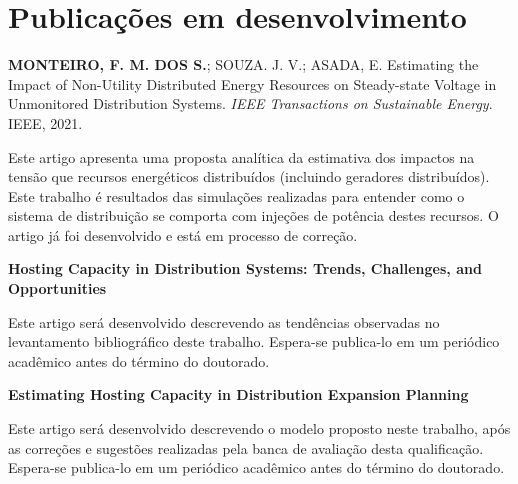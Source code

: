  \section{Publicações em desenvolvimento}
 
 \noindent \textbf{MONTEIRO, F. M. DOS S.}; SOUZA. J. V.; ASADA, E. Estimating the Impact of Non-Utility Distributed Energy Resources on Steady-state Voltage in Unmonitored Distribution Systems. \textit{IEEE Transactions on Sustainable Energy}. IEEE, 2021.

Este artigo apresenta uma proposta analítica da estimativa dos impactos na tensão que recursos energéticos distribuídos (incluindo geradores distribuídos). Este trabalho é resultados das simulações realizadas para entender como o sistema de distribuição se comporta com injeções de potência destes recursos. O artigo já foi desenvolvido e está em processo de correção.

\vspace{1cm}
\noindent \textbf{Hosting Capacity in Distribution Systems: Trends, Challenges, and Opportunities}
 
Este artigo será desenvolvido descrevendo as tendências observadas no levantamento bibliográfico deste trabalho. Espera-se publica-lo em um periódico acadêmico antes do término do doutorado.
 
\vspace{1cm}
\noindent \textbf{Estimating Hosting Capacity in Distribution Expansion Planning}

Este artigo será desenvolvido descrevendo o modelo proposto neste trabalho, após as correções e sugestões realizadas pela banca de avaliação desta qualificação. Espera-se publica-lo em um periódico acadêmico antes do término do doutorado.



\fi